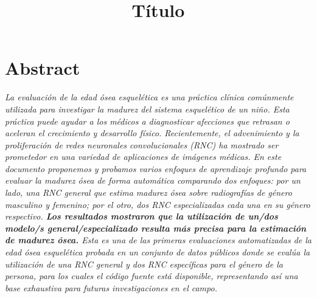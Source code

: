 \documentclass[conference]{IEEEtran}
\begin{document}
\title{Título\\
}

\author{
}

\maketitle

%


\section*{Abstract}

\textit
{
La evaluación de la edad ósea esquelética es una práctica clínica comúnmente utilizada para investigar la madurez del sistema esquelético de un niño. Esta práctica puede ayudar a los médicos a diagnosticar afecciones que retrasan o aceleran el crecimiento y desarrollo físico. Recientemente, el advenimiento y la proliferación de redes neuronales convolucionales (RNC) ha mostrado ser prometedor en una variedad de aplicaciones de imágenes médicas. En este documento proponemos y probamos varios enfoques de aprendizaje profundo para evaluar la madurez ósea de forma automática comparando dos enfoques: por un lado, una RNC general que estima madurez ósea sobre radiografías de género masculino y femenino; por el otro, dos RNC especializadas cada una en su género respectivo. \textbf{Los resultados mostraron que la utilización de un/dos modelo/s general/especializado resulta más precisa para la estimación de madurez ósea.} Esta es una de las primeras evaluaciones automatizadas de la edad ósea esquelética probada en un conjunto de datos públicos donde se evalúa la utilización de una RNC general y dos RNC específicas para el género de la persona, para los cuales el código fuente está disponible, representando así una base exhaustiva para futuras investigaciones en el campo.
}
\end{document}

